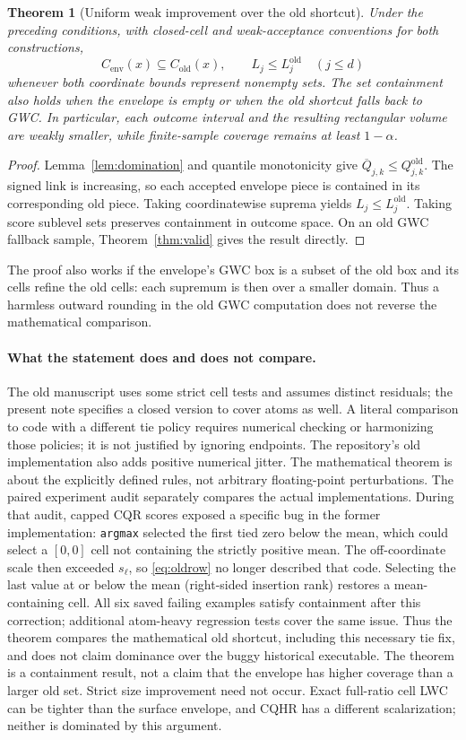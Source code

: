 \documentclass[11pt]{article}
\newtheorem{theorem}{Theorem}[section]
\newcommand{\Cenv}{C_{\mathrm{env}}}
\begin{document}
\begin{theorem}[Uniform weak improvement over the old shortcut]\label{thm:dom}
Under the preceding conditions, with closed-cell and weak-acceptance conventions
for both constructions,
\[
 \Cenv(x)\subseteq C_{\mathrm{old}}(x),\qquad
 L_j\le L_j^{\mathrm{old}}\quad(j\le d)
\]
whenever both coordinate bounds represent nonempty sets. The set containment
also holds when the envelope is empty or when the old shortcut falls back to
GWC. In particular, each outcome interval and the resulting rectangular volume
are weakly smaller, while finite-sample coverage remains at least $1-\alpha$.
\end{theorem}
\begin{proof}
Lemma~\ref{lem:domination} and quantile monotonicity give
$\overline Q_{j,k}\le Q^{\mathrm{old}}_{j,k}$. The signed link is increasing,
so each accepted envelope piece is contained in its corresponding old piece.
Taking coordinatewise suprema yields $L_j\le L_j^{\mathrm{old}}$. Taking score
sublevel sets preserves containment in outcome space. On an old GWC fallback
sample, Theorem~\ref{thm:valid} gives the result directly.
\end{proof}
The proof also works if the envelope's GWC box is a subset of the old box and
its cells refine the old cells: each supremum is then over a smaller domain.
Thus a harmless outward rounding in the old GWC computation does not reverse
the mathematical comparison.

\paragraph{What the statement does and does not compare.}
The old manuscript uses some strict cell tests and assumes distinct residuals;
the present note specifies a closed version to cover atoms as well. A literal
comparison to code with a different tie policy requires numerical checking or
harmonizing those policies; it is not justified by ignoring endpoints.
The repository's old implementation also adds positive numerical jitter.
The mathematical theorem is about the explicitly defined rules, not arbitrary
floating-point perturbations. The paired experiment audit separately compares
the actual implementations. During that audit, capped CQR scores exposed a
specific bug in the former implementation: \texttt{argmax} selected the first
tied zero below the mean, which could select a $[0,0]$ cell not containing the
strictly positive mean. The off-coordinate scale then exceeded $s_\ell$, so
\eqref{eq:oldrow} no longer described that code. Selecting the last value at
or below the mean (right-sided insertion rank) restores a mean-containing cell.
All six saved failing examples satisfy containment after this correction;
additional atom-heavy regression tests cover the same issue. Thus the theorem
compares the mathematical old shortcut, including this necessary tie fix,
and does not claim dominance over the buggy historical executable.
The theorem is a containment result, not a claim
that the envelope has higher coverage than a larger old set. Strict size
improvement need not occur. Exact full-ratio cell LWC can be tighter than the
surface envelope, and CQHR has a different scalarization; neither is dominated
by this argument.
\end{document}
